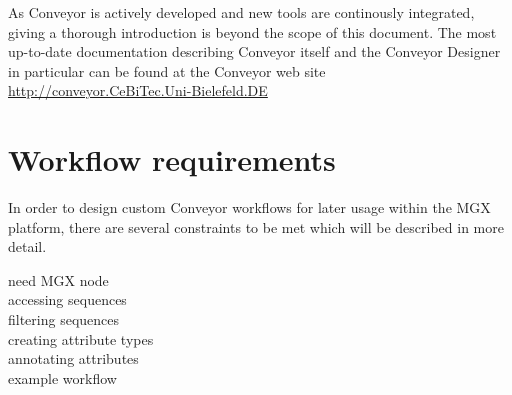 As Conveyor is actively developed and new tools are continously integrated, giving a thorough
introduction is beyond the scope of this document. The most up-to-date documentation describing
Conveyor itself and the Conveyor Designer in particular can be found at the Conveyor web
site \url{http://conveyor.CeBiTec.Uni-Bielefeld.DE}

\section{Workflow requirements}

In order to design custom Conveyor workflows for later usage within the MGX platform, there
are several constraints to be met which will be described in more detail.

need MGX node\\
accessing sequences\\
filtering sequences\\
creating attribute types\\
annotating attributes\\
example workflow\\


